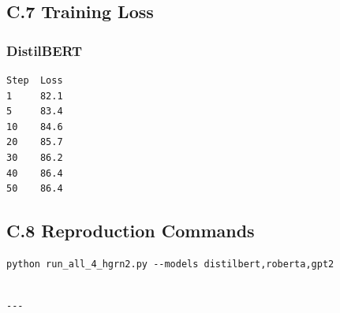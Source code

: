 \subsection{C.7 Training Loss}

\subsubsection{DistilBERT}
\begin{lstlisting}
Step  Loss
1     82.1
5     83.4
10    84.6
20    85.7
30    86.2
40    86.4
50    86.4
\end{lstlisting}

\subsection{C.8 Reproduction Commands}

\begin{lstlisting}
python run_all_4_hgrn2.py --models distilbert,roberta,gpt2
\end{lstlisting}
\begin{lstlisting}

---
\end{lstlisting}
